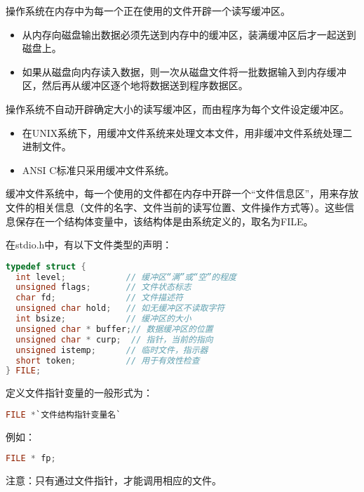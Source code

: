 \begin{frame}[fragile]\ft{\secname}
  \begin{dingyi}[缓冲文件系统]
    操作系统在内存中为每一个正在使用的文件开辟一个读写缓冲区。
  \end{dingyi}


  \begin{itemize}
  \item 从内存向磁盘输出数据必须先送到内存中的缓冲区，装满缓冲区后才一起送到磁盘上。\\[0.1in]
  \item 如果从磁盘向内存读入数据，则一次从磁盘文件将一批数据输入到内存缓冲区，然后再从缓冲区逐个地将数据送到程序数据区。
   \end{itemize} 
  \begin{dingyi}[非缓冲文件系统]
    操作系统不自动开辟确定大小的读写缓冲区，而由程序为每个文件设定缓冲区。
  \end{dingyi}
\end{frame}

\begin{frame}[fragile]\ft{\secname}

  \begin{itemize}
  \item
    在{\tf UNIX}系统下，用缓冲文件系统来处理文本文件，用非缓冲文件系统处理二进制文件。\\[0.1in]
  \item
    {\tf ANSI C}标准只采用缓冲文件系统。
   \end{itemize}  
\end{frame}

\begin{frame}[fragile]\ft{\secname}
缓冲文件系统中，每一个使用的文件都在内存中开辟一个“文件信息区”，用来存放文件的相关信息（文件的名字、文件当前的读写位置、文件操作方式等）。这些信息保存在一个结构体变量中，该结构体是由系统定义的，取名为{\tf FILE}。
\end{frame}

\begin{frame}[fragile]\ft{\secname}
在{\tf stdio.h}中，有以下文件类型的声明：
\begin{lstlisting}[language=c,backgroundcolor=\color{red!20}]
typedef struct {
  int level;            // 缓冲区“满”或“空”的程度
  unsigned flags;       // 文件状态标志
  char fd;              // 文件描述符
  unsigned char hold;   // 如无缓冲区不读取字符
  int bsize;            // 缓冲区的大小
  unsigned char * buffer;// 数据缓冲区的位置
  unsigned char * curp;  // 指针，当前的指向
  unsigned istemp;      // 临时文件，指示器
  short token;          // 用于有效性检查
} FILE;  
\end{lstlisting}
\end{frame}

\begin{frame}[fragile]\ft{\secname}
定义文件指针变量的一般形式为：
\begin{lstlisting}[language=c,backgroundcolor=\color{red!20}]
FILE *`文件结构指针变量名`  
\end{lstlisting}


例如：
\begin{lstlisting}[language=c,backgroundcolor=\color{red!20}]
FILE * fp;
\end{lstlisting}


注意：只有通过文件指针，才能调用相应的文件。
\end{frame}







